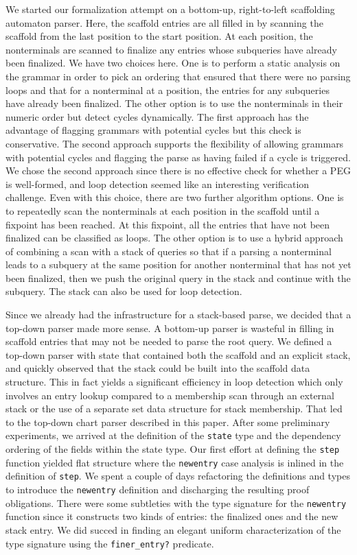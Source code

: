 \documentclass[sigplan,10pt,anonymous,review]{acmart}\settopmatter{printfolios=true,printccs=false,printacmref=false}
\begin{document}
\begin{CCSXML}
We started our formalization attempt on a bottom-up, right-to-left
scaffolding automaton parser.   Here, the scaffold entries
are all filled in by scanning the scaffold from the last position to the
start position.  At each position, the nonterminals are scanned 
to finalize any entries whose subqueries have already been finalized.
We have two choices here.  One is to perform a static analysis on the
grammar in order to pick an ordering that ensured that there were no
parsing loops and that for a nonterminal at a position, the entries for
any subqueries have already been finalized.  The other option is to
use the nonterminals in their numeric order but detect cycles dynamically.
The first approach has the advantage of flagging grammars with
potential cycles but this check is conservative.  The second approach supports the flexibility of allowing
grammars with potential cycles and flagging the parse as having failed if
a cycle is triggered.  We chose the second approach since there is no 
effective check for whether a PEG is well-formed, and loop detection
seemed like an interesting verification challenge.  Even with this choice,
there are two further algorithm options.  One is to repeatedly scan the
nonterminals at each position in the scaffold until a fixpoint has been reached.  At this
fixpoint, all the entries that have not been finalized can be classified as
loops.  The other option is
to use a hybrid approach of combining a scan with  a stack of queries so that if a
parsing a nonterminal leads to a subquery at the same position for another
nonterminal that has not yet been finalized, then we push the original query in the stack and continue with the subquery.  The stack can also be used for loop detection.

Since we already had the infrastructure for a stack-based parse,  we
decided that a top-down parser made more sense.  A bottom-up parser is
wasteful in filling in scaffold entries that may not be needed to
parse the root query.  We  defined a top-down parser with state
that contained both the scaffold and an explicit stack, and 
quickly observed that the stack could be built into the scaffold data
structure.  This in fact yields a significant efficiency in loop
detection which only involves an entry lookup compared to a membership
scan through an external stack or the use of a separate set data structure
for stack membership.  
That led to the top-down chart parser
described in this paper.  After some preliminary experiments, we arrived
at the definition of the \texttt{state} type and the dependency ordering of
the fields within the state type.  
Our first effort at defining the \texttt{step} function yielded 
flat structure where  the \texttt{newentry} case analysis is inlined in the
definition of \texttt{step}\@.  We spent a couple of days refactoring
the definitions and types to introduce the \texttt{newentry} definition
and discharging the resulting proof obligations.  
There were some subtleties with the type signature for the \texttt{newentry}
function since it constructs two kinds of entries: the finalized ones and 
the new stack entry.  We did succed in finding an elegant uniform characterization
of the type signature using the \texttt{finer\_entry?} predicate.




\end{CCSXML}
\end{document}
